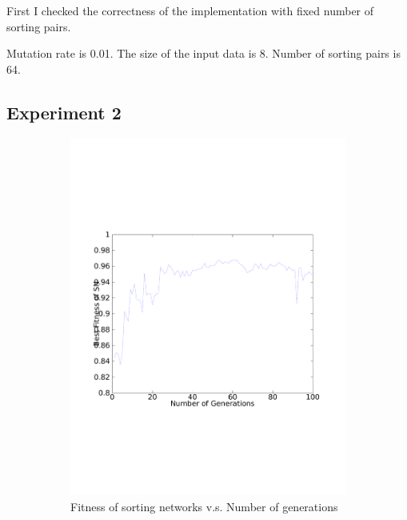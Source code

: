 \documentclass[11pt]{article}
\begin{document}
First I checked the correctness of the implementation with fixed
number of sorting pairs.

Mutation rate is 0.01. The size of the input data is 8. Number of
sorting pairs is 64. 

\subsection{Experiment 2}

\begin{figure}[h!]
\centering
\begin{subfigure}[b]{0.49\textwidth}
	\includegraphics[width=\textwidth]{2_1.pdf}
	\caption{Fitness of sorting networks v.s. Number of generations}
\end{subfigure}
\begin{subfigure}[b]{0.49\textwidth}

\end{subfigure}
\end{figure}
\end{document}

